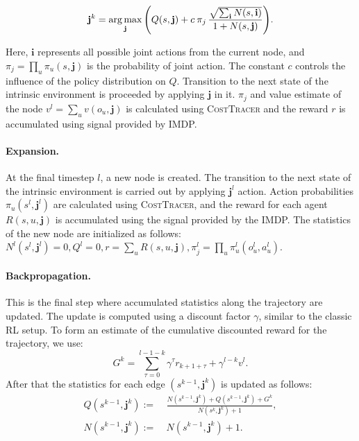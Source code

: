 \documentclass[letterpaper]{article} %
\newcommand{\argmax}{\operatornamewithlimits{arg\,max}}  %
\begin{document}
\begin{equation*}
    \mathbf{j}^k = \argmax_{\mathbf{j}} \Bigg( {Q(s, \mathbf{j}}) + c\:\pi_j\,\frac{\sqrt{\sum_\mathbf{i}{N(s, \mathbf{i})}}}{1 + N(s,\mathbf{j})} \Bigg).
\end{equation*}

Here, $\mathbf{i}$ represents all possible joint actions from the current node, and $\pi_j=\prod_u{\pi_u(s,\mathbf{j})}$ is the probability of joint action. The constant $c$ controls the influence of the policy distribution on $Q$. Transition to the next state of the intrinsic environment is proceeded by applying $\mathbf{j}$ in it. $\pi_j$ and value estimate of the node $v^l = \sum_u{v(o_u, \mathbf{j})}$ is calculated using \textsc{CostTracer} and  the reward $r$ is accumulated using signal provided by IMDP.

\paragraph{Expansion.} At the final timestep $l$, a new node is created. The transition to the next state of the intrinsic environment is carried out by applying $\mathbf{j}^l$ action. Action probabilities $\pi_u(s^l,\mathbf{j}^l)$ are calculated using \textsc{CostTracer}, and the reward for each agent $R(s,u, \mathbf{j})$ is accumulated using the signal provided by the  IMDP. The statistics of the new node are initialized as follows: $N^l(s^l, \mathbf{j}^l)=0, Q^l=0, r=\sum_u{R(s,u, \mathbf{j})}, \pi_j^l= \prod_u{\pi_u^l(o_u^l,a_u^l)}$.

\paragraph{Backpropagation.} This is the final step where accumulated statistics along the trajectory are updated. The update is computed using a discount factor $\gamma$, similar to the classic RL setup. To form an estimate of the cumulative discounted reward for the trajectory, we use:
\begin{equation*}
G^k = \sum_{\tau=0}^{l-1-k}\gamma^\tau r_{k+1+\tau}+\gamma^{l-k}v^l.
\end{equation*}
After that the statistics for each edge $(s^{k-1}, \mathbf{j}^k)$ is updated as follows:
\begin{equation*}
\begin{aligned}
  Q(s^{k-1},\mathbf{j}^k) := &\: \frac{N(s^{k-1},  \mathbf{j}^k) + Q(s^{k-1},\mathbf{j}^k) + G^k}{N(s^{k},  \mathbf{j}^k) + 1}, \\
N(s^{k-1}, \mathbf{j}^k) := &\: N(s^{k-1},  \mathbf{j}^k) + 1.
  \end{aligned}
\end{equation*}
\end{document}
